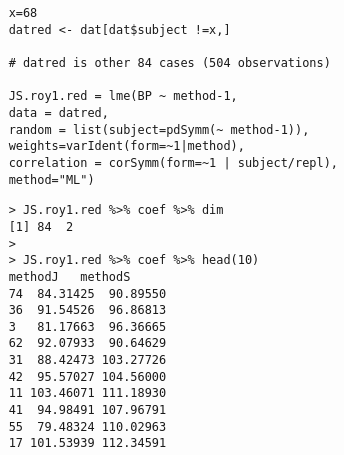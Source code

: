 \documentclass[Main.tex]{subfiles}
\begin{document}
\begin{framed}
	\begin{verbatim}
	x=68
	datred <- dat[dat$subject !=x,]
	
	# datred is other 84 cases (504 observations)
	
	JS.roy1.red = lme(BP ~ method-1, 
	data = datred,
	random = list(subject=pdSymm(~ method-1)), 
	weights=varIdent(form=~1|method),
	correlation = corSymm(form=~1 | subject/repl), 
	method="ML")
	\end{verbatim}
\end{framed}

\begin{framed}
	\begin{verbatim}
	> JS.roy1.red %>% coef %>% dim
	[1] 84  2
	>
	> JS.roy1.red %>% coef %>% head(10)
	methodJ   methodS
	74  84.31425  90.89550
	36  91.54526  96.86813
	3   81.17663  96.36665
	62  92.07933  90.64629
	31  88.42473 103.27726
	42  95.57027 104.56000
	11 103.46071 111.18930
	41  94.98491 107.96791
	55  79.48324 110.02963
	17 101.53939 112.34591
	
	\end{verbatim}
\end{framed}




\end{document}
